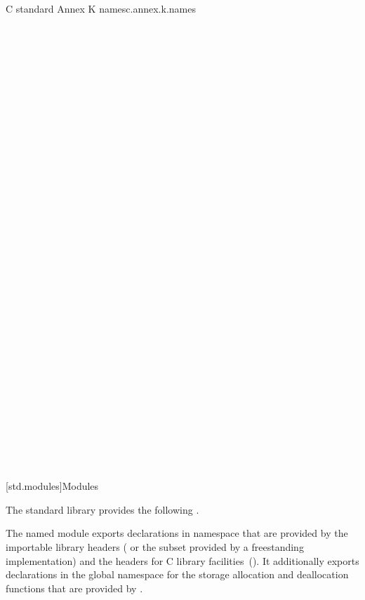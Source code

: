 \begin{multicolfloattable}{C standard Annex K names}{c.annex.k.names}
 \\
 \\
 \\
 \\
 \\
 \\
 \\
 \\
 \\
 \\
 \\
 \\
 \\
 \\
 \\
 \\
 \\
\columnbreak
{} \\
 \\
 \\
 \\
 \\
 \\
 \\
 \\
 \\
 \\
 \\
 \\
 \\
 \\
 \\
 \\
 \\
\end{multicolfloattable}

[std.modules]{Modules}

\pnum
The \Cpp{} standard library provides
the following .

\pnum
The named module  exports declarations in namespace 
that are provided by the importable \Cpp{} library headers
( or the subset provided by a freestanding implementation)
and the \Cpp{} headers for C library facilities~().
It additionally exports declarations in the global namespace
for the storage allocation and deallocation functions
that are provided by .

